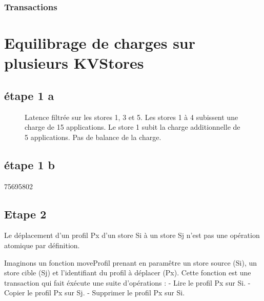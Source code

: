 \documentclass[a4paper,11pt]{article}
\begin{document}
\subsubsection*{Transactions}


\section*{Equilibrage de charges sur plusieurs KVStores}

\subsection*{étape 1 a}

\begin{figure}

    \caption{
        Latence filtrée sur les stores 1, 3 et 5. 
        Les stores 1 à 4 subissent une charge de 15 applications. 
        Le store 1 subit la charge additionnelle de 5 applications. 
        Pas de balance de la charge.
        }
            
    \label{stores_nobalancing}
\end{figure}


\subsection*{étape 1 b}
75695802

\subsection*{Etape 2}
Le déplacement d'un profil Px d'un store Si à un store Sj n'est pas une opération atomique par définition. 

Imaginons un fonction moveProfil prenant en paramêtre un store source (Si), un store cible (Sj) et l'identifiant du profil à déplacer (Px). Cette fonction est une transaction qui fait éxécute une suite d'opérations :
- Lire le profil Px sur Si.
- Copier le profil Px sur Sj.
- Supprimer le profil Px sur Si.
\end{document}
